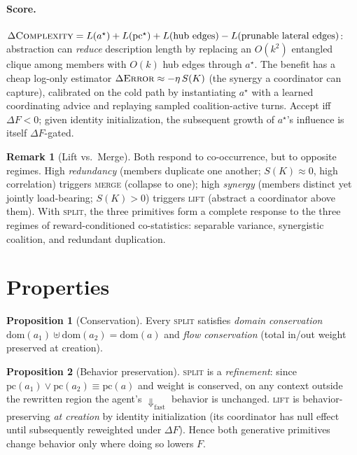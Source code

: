 \documentclass[11pt]{article}
\theoremstyle{definition}
\newtheorem{proposition}{Proposition}
\newtheorem{remark}{Remark}
\begin{document}
\paragraph{Score.}
$\Delta\textsc{Complexity}=L(a^\star)+L(\mathrm{pc}^\star)+L(\text{hub edges})-L(\text{prunable lateral edges})$:
abstraction can \emph{reduce} description length by replacing an $O(k^2)$
entangled clique among members with $O(k)$ hub edges through $a^\star$. The
benefit has a cheap log-only estimator $\Delta\textsc{Error}\approx-\eta\,S(K)$
(the synergy a coordinator can capture), calibrated on the cold path by
instantiating $a^\star$ with a learned coordinating advice and replaying sampled
coalition-active turns. Accept iff $\Delta F<0$; given identity initialization,
the subsequent growth of $a^\star$'s influence is itself $\Delta F$-gated.

\begin{remark}[Lift vs.\ Merge]
Both respond to co-occurrence, but to opposite regimes. High \emph{redundancy}
(members duplicate one another; $S(K)\approx0$, high correlation) triggers
\textsc{merge} (collapse to one); high \emph{synergy} (members distinct yet
jointly load-bearing; $S(K)>0$) triggers \textsc{lift} (abstract a coordinator
above them). With \textsc{split}, the three primitives form a complete response
to the three regimes of reward-conditioned co-statistics: separable variance,
synergistic coalition, and redundant duplication.
\end{remark}

\section{Properties}
\label{sec:props}

\begin{proposition}[Conservation]
Every \textsc{split} satisfies \emph{domain conservation}
$\mathrm{dom}(a_1)\uplus\mathrm{dom}(a_2)=\mathrm{dom}(a)$ and
\emph{flow conservation} (total in/out weight preserved at creation).
\end{proposition}

\begin{proposition}[Behavior preservation]
\textsc{split} is a \emph{refinement}: since
$\mathrm{pc}(a_1)\vee\mathrm{pc}(a_2)\equiv\mathrm{pc}(a)$ and weight is
conserved, on any context outside the rewritten region the agent's
$\Downarrow_\text{fast}$ behavior is unchanged. \textsc{lift} is
behavior-preserving \emph{at creation} by identity initialization (its
coordinator has null effect until subsequently reweighted under $\Delta F$).
Hence both generative primitives change behavior only where doing so lowers $F$.
\end{proposition}
\end{document}
